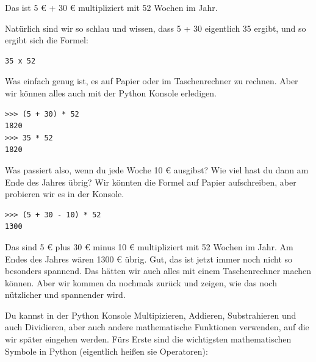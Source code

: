 Das ist 5 € + 30 € multipliziert mit 52 Wochen im Jahr. \begin{samepage}Natürlich sind wir so schlau und wissen, dass 5 + 30 eigentlich 35 ergibt, und so ergibt sich die Formel:


\begin{verbatim}
35 x 52
\end{verbatim}
\end{samepage}

Was einfach genug ist, es auf Papier oder im Taschenrechner zu rechnen. Aber wir können alles auch mit der Python Konsole erledigen.

\begin{Verbatim}[frame=single]
>>> (5 + 30) * 52
1820
>>> 35 * 52
1820
\end{Verbatim}

Was passiert also, wenn du jede Woche 10 € ausgibst? Wie viel hast du dann am Ende des Jahres übrig? Wir könnten die Formel auf Papier aufschreiben, aber probieren wir es in der Konsole.

\begin{Verbatim}[frame=single]
>>> (5 + 30 - 10) * 52
1300
\end{Verbatim}

Das sind 5 € plus 30 € minus 10 € multipliziert mit 52 Wochen im Jahr. Am Endes des Jahres wären 1300 € übrig. Gut, das ist jetzt immer noch nicht so besonders spannend. Das hätten wir auch alles mit einem Taschenrechner machen können. Aber wir kommen da nochmals zurück und zeigen, wie das noch nützlicher und spannender wird.

Du kannst in der Python Konsole Multipizieren, Addieren, Substrahieren und auch Dividieren, aber auch andere mathematische Funktionen verwenden, auf die wir später eingehen werden. Fürs Erste sind die wichtigsten mathematischen Symbole in Python (eigentlich heißen sie Operatoren):

